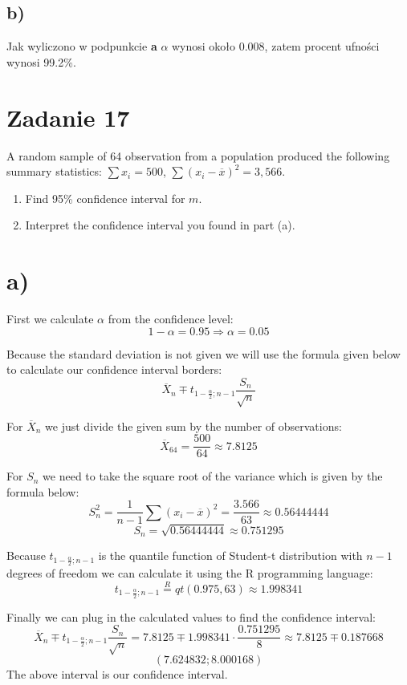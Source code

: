 \documentclass{article}
\begin{document}
\subsection{b)}
Jak wyliczono w podpunkcie \textbf{a} $\alpha$ wynosi około 0.008, zatem procent ufności wynosi 99.2\%.

\section{Zadanie 17}
A random sample of 64 observation from a population produced the following summary statistics: $\sum x_i=500$, $\sum(x_i-\overline{x})^2=3,566$.
\begin{enumerate}[label = \alph*)]
\item Find 95\% confidence interval for $m$.
\item Interpret the confidence interval you found in part (a).
\end{enumerate}

\section{a)}
First we calculate $\alpha$ from the confidence level:
\[ 1 - \alpha = 0.95 \Rightarrow \alpha = 0.05 \]

Because the standard deviation is not given we will use the formula given below to calculate our confidence interval borders:
\[ \overline{X}_n \mp t_{1-\frac{\alpha}{2};n-1} \frac{S_n}{\sqrt{n}} \]

For $\overline{X}_n$ we just divide the given sum by the number of observations:
\[ \overline{X}_64 = \frac{500}{64} \approx 7.8125 \]

For $S_n$ we need to take the square root of the variance which is given by the formula below:
\[ S_n^2 = \frac{1}{n-1}\sum(x_i-\overline{x})^2 = \frac{3.566}{63} \approx 0.56444444 \]
\[ S_n = \sqrt{0.56444444} \approx 0.751295 \]

Because $ t_{1-\frac{\alpha}{2};n-1}$ is the quantile function of Student-t distribution with $n-1$ degrees of freedom we can calculate it using the R programming language:
\[  t_{1-\frac{\alpha}{2};n-1} \overset{R}{=} qt(0.975, 63) \approx 1.998341 \]

Finally we can plug in the calculated values to find the confidence interval:
\[ \overline{X}_n \mp t_{1-\frac{\alpha}{2};n-1} \frac{S_n}{\sqrt{n}} = 7.8125 \mp 1.998341\cdot \frac{0.751295}{8} \approx 7.8125 \mp 0.187668\]
\[ (7.624832 ; 8.000168) \]
The above interval is our confidence interval.
\end{document}
